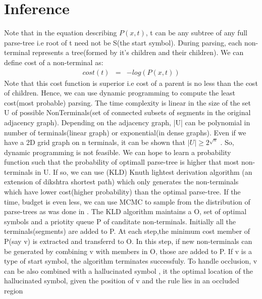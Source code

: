 \documentclass[11pt]{article} %
\begin{document}
\section{Inference}
Note that in the equation describing $P(x,t)$, t can be any subtree of any full parse-tree i.e root of t need not be S(the start symbol). During parsing, each non-terminal represents a tree(formed by it's children and their children). We can define cost of a non-terminal as:
\begin{eqnarray}
cost(t)&=&-log(P(x,t))
\end{eqnarray}
 Note that this cost function is superior i.e cost of a parent is no less than the cost of children. Hence, we can use dynamic programming to compute the least cost(most probable) parsing. The time complexity is linear in the size of the set U of possible NonTerminals(set of connected subsets of segments in the original adjacency graph). Depending on the adjacency graph, |U| can be polynomial in number of terminals(linear graph) or exponential(in dense graphs). Even if we have a 2D grid graph on n terminals, it can be shown that $|U|\ge 2^{\sqrt{n}}$ . So, dynamic programming is not feasible. We can hope to learn a probability function such that the probability of optimall parse-tree is higher that most non-terminals in U. If so, we can use (KLD) Knuth lightest derivation algorithm (an extension of dikshtra shortest path) which only generates the non-terminals which have lower cost(higher probability) than the optimal parse-tree. If the time, budget is even less, we can use MCMC to sample from the distribution of parse-trees as was done in \cite{zhu2011}. The KLD algorithm maintains a O, set of optimal symbols and a priotity queue P of canditate non-terminals.  Initially all the terminals(segments) are added to P.  At each step,the minimum cost member of P(say v) is extracted and transferrd to O. In this step, if new non-terminals can be generated by combining v with members in O, those are added to P. If v is a type of start symbol, the algorithm terminates successfuly. To handle occlusion, v can be also combined with a hallucinated symbol , it the optimal location of the hallucinated symbol, given the position of v and the rule lies in an occluded region
\end{document}
